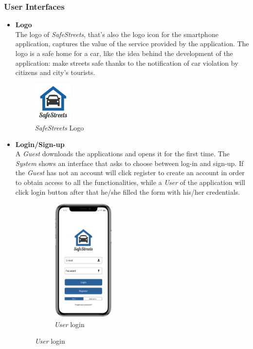 \documentclass {article}
\begin{document}
	\subsubsection{User Interfaces} 
	\begin{itemize} 
		\item {\bf Logo} \\
		The logo of {\it SafeStreets}, that's also the logo icon for the smartphone application, captures the value of the service provided by the application. The logo is a safe home for a car, like the idea behind the development of the application: make streets safe thanks to the notification of car violation by citizens and city's tourists.
			\begin{figure}[H]
				\centering
				\includegraphics[height=2cm]{safestreets_logo.png}
				\caption{{\it SafeStreets} Logo}
			\end{figure}
		\item {\bf Login/Sign-up} \\
		A {\it Guest} downloads the applications and opens it for the first time. The {\it System} shows an interface that asks to choose between log-in and sign-up. If the {\it Guest} has not an account will click register to create an account in order to obtain access to all  the functionalities, while a {\it User} of the application will click login button after that he/she filled the form with his/her credentials. 
			\begin{figure} [H]
			\centering
			\begin{subfigure}{.4\textwidth}
				\centering
				\includegraphics[height=6.2cm]{Images/Interfaces/login_user.png}
				\caption{{\it User} login}
			\end{subfigure}

\end{figure}
\end{itemize}
\end{document}
